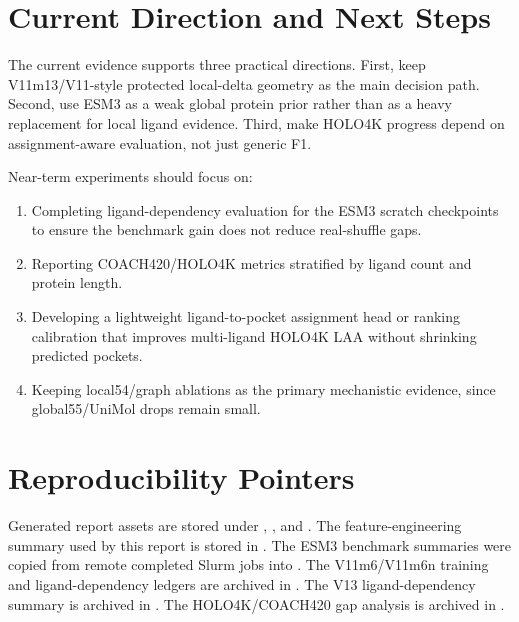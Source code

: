 \documentclass[11pt]{article}
\begin{document}
\section*{Current Direction and Next Steps}
The current evidence supports three practical directions.
First, keep V11m13/V11-style protected local-delta geometry as the main decision path.
Second, use ESM3 as a weak global protein prior rather than as a heavy replacement for local ligand evidence.
Third, make HOLO4K progress depend on assignment-aware evaluation, not just generic F1.

Near-term experiments should focus on:
\begin{enumerate}
  \item Completing ligand-dependency evaluation for the ESM3 scratch checkpoints to ensure the benchmark gain does not reduce real-shuffle gaps.
  \item Reporting COACH420/HOLO4K metrics stratified by ligand count and protein length.
  \item Developing a lightweight ligand-to-pocket assignment head or ranking calibration that improves multi-ligand HOLO4K LAA without shrinking predicted pockets.
  \item Keeping local54/graph ablations as the primary mechanistic evidence, since global55/UniMol drops remain small.
\end{enumerate}

\section*{Reproducibility Pointers}
Generated report assets are stored under , , and .
The feature-engineering summary used by this report is stored in .
The ESM3 benchmark summaries were copied from remote completed Slurm jobs into .
The V11m6/V11m6n training and ligand-dependency ledgers are archived in .
The V13 ligand-dependency summary is archived in .
The HOLO4K/COACH420 gap analysis is archived in .
\end{document}
